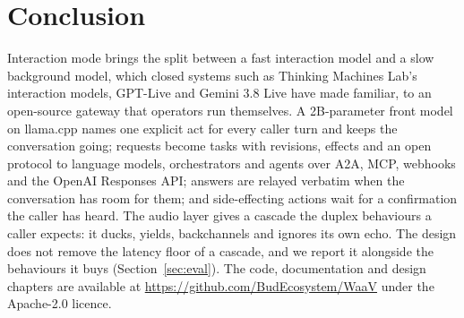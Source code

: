 \section{Conclusion}\label{sec:conclusion}

Interaction mode brings the split between a fast interaction model and a slow background model, which
closed systems such as Thinking Machines Lab's interaction models, GPT-Live and Gemini 3.8 Live have made
familiar, to an open-source gateway that operators run themselves. A 2B-parameter front model on llama.cpp
names one explicit act for every caller turn and keeps the conversation going; requests become tasks with
revisions, effects and an open protocol to language models, orchestrators and agents over A2A, MCP, webhooks
and the OpenAI Responses API; answers are relayed verbatim when the conversation has room for them; and
side-effecting actions wait for a confirmation the caller has heard. The audio layer gives a cascade the
duplex behaviours a caller expects: it ducks, yields, backchannels and ignores its own echo. The design does
not remove the latency floor of a cascade, and we report it alongside the behaviours it buys
(Section~\ref{sec:eval}). The code, documentation and design chapters are available at
\url{https://github.com/BudEcosystem/WaaV} under the Apache-2.0 licence.
